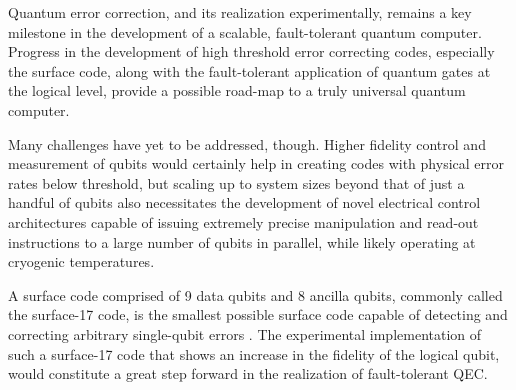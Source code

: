Quantum error correction, and its realization experimentally, remains a key
milestone in the development of a scalable, fault-tolerant quantum computer.
Progress in the development of high threshold error correcting codes, especially
the surface code, along with the fault-tolerant application of quantum gates at
the logical level, provide a possible road-map to a truly universal quantum
computer.

Many challenges have yet to be addressed, though. Higher fidelity control and
measurement of qubits would certainly help in creating codes with physical error
rates below threshold, but scaling up to system sizes beyond that of just a
handful of qubits also necessitates the development of novel electrical control
architectures capable of issuing extremely precise manipulation and read-out
instructions to a large number of qubits in parallel, while likely operating at
cryogenic temperatures.

A surface code comprised of 9 data qubits and 8 ancilla qubits, commonly called
the surface-17 code, is the smallest possible surface code capable of detecting
and correcting arbitrary single-qubit errors
\cite{obrien17_densit_matrix_simul_small_surfac}. The experimental
implementation of such a surface-17 code that shows an increase in the fidelity
of the logical qubit, would constitute a great step forward in the realization
of fault-tolerant QEC.


